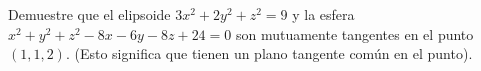 \item Demuestre que el elipsoide $3x^2 + 2y^2 + z^2 = 9$ y la esfera $x^2 + y^2 + z^2 - 8x - 6y - 8z + 24 = 0$ son mutuamente tangentes en el punto $(1, 1, 2)$. (Esto significa que tienen un plano tangente común en el punto).

